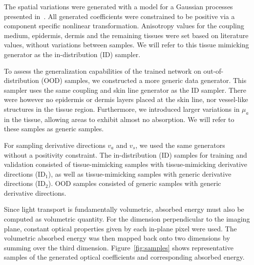 \documentclass[journal,twoside,web]{ieeecolor}
\begin{document}
The spatial variations were generated with a model for a Gaussian processes presented in~\cite{Arras2022}. %
All generated coefficients were constrained to be positive via a component specific nonlinear transformation. %
Anisotropy values for the coupling medium, epidermis, dermis and the remaining tissues were set based on literature values, without variations between samples. %
We will refer to this tissue mimicking generator as the in-distribution (ID) sampler. %
\par
To assess the generalization capabilities of the trained network on out-of-distribution (OOD) samples, we constructed a more generic data generator. %
This sampler uses the same coupling and skin line generator as the ID sampler. %
There were however no epidermis or dermis layers placed at the skin line, nor vessel-like structures in the tissue region. %
Furthermore, we introduced larger variations in $\mu_a$ in the tissue, allowing areas to exhibit almost no absorption. %
We will refer to these samples as generic samples. %
\par
For sampling derivative directions $v_a$ and $v_s$, we used the same generators without a positivity constraint. %
The in-distribution (ID) samples for training and validation consisted of tissue-mimicking samples with tissue-mimicking derivative directions (ID$_1$), as well as tissue-mimicking samples with generic derivative directions (ID$_2$). %
OOD samples consisted of generic samples with generic derivative directions.
\par
Since light transport is fundamentally volumetric, absorbed energy must also be computed as volumetric quantity. %
For the dimension perpendicular to the imaging plane, constant optical properties given by each in-plane pixel were used. %
The volumetric absorbed energy was then mapped back onto two dimensions by summing over the third dimension. %
Figure~\ref{fig:samples} shows representative samples of the generated optical coefficients and corresponding absorbed energy.
\end{document}
